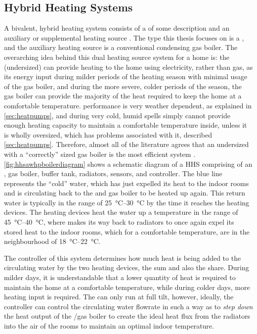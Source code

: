\subsection{Hybrid Heating Systems}
A bivalent, hybrid \HP heating system consists of a \HP of some description and an auxiliary or supplemental heating source \cite{blackman_study_2019}. The \HP type this thesis focuses on is a \AWHP, and the auxiliary heating source is a conventional condensing gas boiler. The overarching idea behind this dual heating source system for a home is: the (undersized) \HP can provide heating to the home using electricity, rather than gas, as its energy input during milder periods of the heating season with minimal usage of the gas boiler, and during the more severe, colder periods of the season, the gas boiler can provide the majority of the heat required to keep the home at a comfortable temperature. \AWHP performance is very weather dependent, as explained in \cref{sec:heatpumps}, and during very cold, humid spells simply cannot provide enough heating capacity to maintain a comfortable temperature inside, unless it is wholly oversized, which has problems associated with it, described \cref{sec:heatpumps}. Therefore, almost all of the literature agrees that an undersized \HP with a ``correctly'' sized gas boiler is the most efficient system \cite{park_performance_2014,bagarella_annual_2016,dongellini_influence_2021,rauschkolb_cost-optimal_2020}. \cref{fig:hhsawhpboilerdiagram} shows a schematic diagram of a \ac{HHS} comprising of an \AWHP, gas boiler, buffer tank, radiators, sensors, and controller. The blue line represents the ``cold'' water, which has just expelled its heat to the indoor rooms and is circulating back to the \HP and gas boiler to be heated up again. This return water is typically in the range of \qtyrange{25}{30}{\celsius} by the time it reaches the heating devices. The heating devices heat the water up a temperature in the range of \qtyrange{45}{40}{\celsius}, where makes its way back to radiators to once again expel its stored heat to the indoor rooms, which for a comfortable temperature, are in the neighbourhood of \qtyrange{18}{22}{\celsius}.

The controller of this system determines how much heat is being added to the circulating water by the two heating devices, the sum and also the share. During milder days, it is understandable that a lower quantity of heat is required to maintain the home at a comfortable temperature, while during colder days, more heating input is required. The \AWHP can only run at full tilt, however, ideally, the controller can control the circulating water flowrate in such a way as to \textit{step down} the heat output of the \AWHP/gas boiler to create the ideal heat flux from the radiators into the air of the rooms to maintain an optimal indoor temperature.

